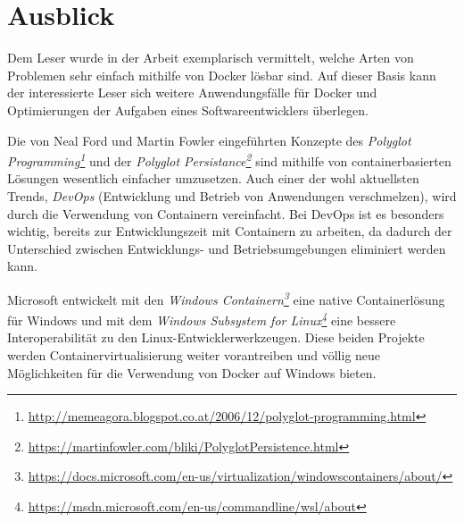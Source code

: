\section{Ausblick}
Dem Leser wurde in der Arbeit exemplarisch vermittelt, welche Arten von Problemen sehr einfach mithilfe von Docker lösbar sind.
Auf dieser Basis kann der interessierte Leser sich weitere Anwendungsfälle für Docker und Optimierungen der Aufgaben eines Softwareentwicklers überlegen.

Die von Neal Ford und Martin Fowler eingeführten Konzepte des \emph{Polyglot Programming\footnote{\url{http://memeagora.blogspot.co.at/2006/12/polyglot-programming.html}}} und der \emph{Polyglot Persistance\footnote{\url{https://martinfowler.com/bliki/PolyglotPersistence.html}}} sind mithilfe von containerbasierten Lösungen wesentlich einfacher umzusetzen.
Auch einer der wohl aktuellsten Trends, \emph{DevOps} (Entwicklung und Betrieb von Anwendungen verschmelzen), wird durch die Verwendung von Containern vereinfacht.
Bei DevOps ist es besonders wichtig, bereits zur Entwicklungszeit mit Containern zu arbeiten, da dadurch der Unterschied zwischen Entwicklungs- und Betriebsumgebungen eliminiert werden kann.

Microsoft entwickelt mit den \emph{Windows Containern\footnote{\url{https://docs.microsoft.com/en-us/virtualization/windowscontainers/about/}}} eine native Containerlösung für Windows und mit dem \emph{Windows Subsystem for Linux\footnote{\url{https://msdn.microsoft.com/en-us/commandline/wsl/about}}} eine bessere Interoperabilität zu den Linux-Entwicklerwerkzeugen.
Diese beiden Projekte werden Containervirtualisierung weiter vorantreiben und völlig neue Möglichkeiten für die Verwendung von Docker auf Windows bieten.
